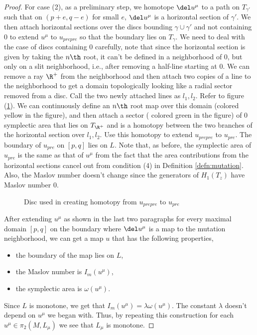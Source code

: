 \begin{proof}
 For case (2), as a preliminary step, we homotope $\del u^\mu$ to a path on $T_{\gamma'}$ such that on $(p+e,q-e)$ for small $e$, $\del u^\mu$ is a horizontal section of $\gamma'$. We then attach horizontal sections over the discs bounding $\gamma \cup \gamma'$ and not containing 0 to extend $u^\mu$ to $u_{prepre}$ so that the boundary lies on $T_\gamma$. We need to deal with the case of discs containing 0 carefully, note that since the horizontal section is given by taking the $n\th$ root, it can't be defined in a neighborhood of 0, but only on a slit neighborhood, i.e., after removing a half-line starting at 0. We can remove a ray $\R^+$ from the neighborhood and then attach two copies of a line to the neighborhood to get a domain topologically looking like a radial sector removed from a disc. Call the two newly attached lines as $l_1, l_2$. Refer to figure (\ref{fig:monotonicity_sections}). We can continuously define an $n\th$ root map over this domain (colored yellow in the figure), and then attach a sector ( colored green in the figure) of 0 symplectic area that lies on $T_{\R^+}$ and is a homotopy between the two branches of the horizontal section over $l_1,l_2$. Use this homotopy to extend $u_{prepre}$ to $u_{pre}$. The boundary of $u_{pre}$ on $[p,q]$ lies on $L$. Note that, as before, the symplectic area of $u_{pre}$ is the same as that of $u^\mu$ from the fact that the area contributions from the horizontal sections cancel out from condition (4) in Definition \ref{defn:mutation}. Also, the Maslov number doesn't change since the generators of $H_1(T_z)$ have Maslov number 0.
\begin{figure}[ht]
    \centering
    \caption{Disc used in creating homotopy from $u_{prepre}$ to $u_{pre}$ }
    \label{fig:monotonicity_sections}
\end{figure}

After extending $u^\mu$ as shown in the last two paragraphs for every maximal domain $[p,q]$ on the boundary where $\del u^\mu$ is a map to the mutation neighborhood, we can get a map $u$ that has the following properties, 
\begin{itemize}
    \item the boundary of the map lies on $L$,
    \item the Maslov number is $I_m(u^\mu)$,
    \item  the symplectic area is $\omega(u^\mu)$.
\end{itemize}
Since $L$ is monotone, we get that $I_m(u^\mu)  = \lambda \omega(u^\mu)$. The constant $\lambda$ doesn't depend on $u^\mu$ we began with. Thus, by repeating this construction for each $u^\mu \in \pi_2(M,L_\mu)$ we see that $L_\mu$ is monotone.

\end{proof}

